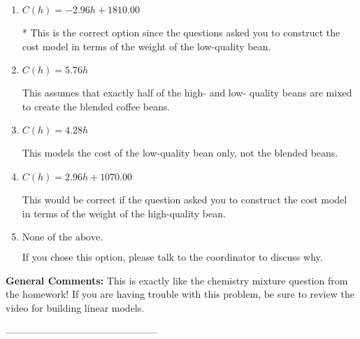 \documentclass{extbook}[14pt]
\begin{document}
\begin{enumerate}[label=\Alph*.] 
\item $ C(h) = -2.96 h + 1810.00 $ 

 * This is the correct option since the questions asked you to construct the cost model in terms of the weight of the low-quality bean. 
\item $ C(h) = 5.76 h $ 

 This assumes that exactly half of the high- and low- quality beans are mixed to create the blended coffee beans. 
\item $ C(h) = 4.28 h $ 

 This models the cost of the low-quality bean only, not the blended beans. 
\item $ C(h) = 2.96 h + 1070.00 $ 

 This would be correct if the question asked you to construct the cost model in terms of the weight of the high-quality bean. 
\item $ \text{None of the above.} $ 

 If you chose this option, please talk to the coordinator to discuss why. 
\end{enumerate} 
 
\textbf{General Comments:} This is exactly like the chemistry mixture question from the homework! If you are having trouble with this problem, be sure to review the video for building linear models.

-----------------------------------------------
\end{document}
